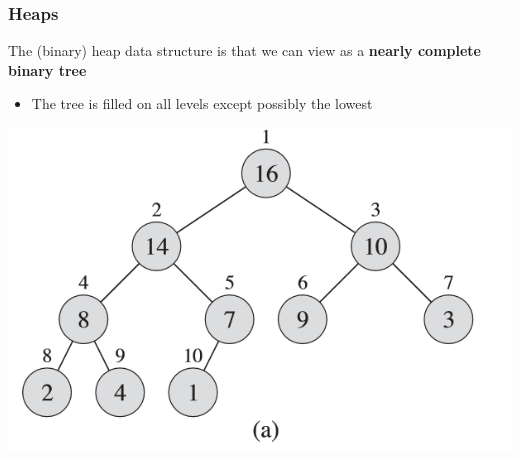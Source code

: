 \documentclass[UTF8,11pt]{beamer}
\begin{document}
\begin{frame}           %
\frametitle{Heaps}
\begin{block}{}
	The (binary) heap data structure is \textbf{} that we can view as a \textbf{\color{blue}nearly complete binary tree}
	\pause
	\begin{itemize}
		\item The tree is  filled on all levels {\color{blue}except possibly} the {\color{blue}lowest}
	\end{itemize} 
\end{block}
\begin{block}{}
	\begin{center}
	\includegraphics[width=.4\textwidth]{figs/heap_tree.png}
	\end{center}
	
\end{block}
\end{frame}
\end{document}
